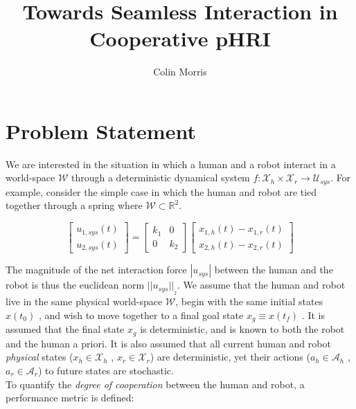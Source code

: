 \documentclass[conference]{IEEEtran}
\begin{document}
\title{Towards Seamless Interaction in \\ Cooperative pHRI} 
\author{Colin Morris}
\maketitle

\section{Problem Statement} 
\hspace{5mm}
We are interested in the situation in which a human and a robot interact in a world-space $\mathcal{W}$ through a deterministic dynamical system $f : \mathcal{X}_h \times \mathcal{X}_r \rightarrow \mathcal{U}_{sys}$. For example, consider the simple case in which the human and robot are tied together through a spring where $\mathcal{W}\subset\mathbb{R}^2$. 

\begin{equation*}
\begin{bmatrix} u_{1,sys}(t)\\u_{2,sys}(t) \end{bmatrix} = 
\begin{bmatrix} k_1&0\\0&k_2 \end{bmatrix}
\begin{bmatrix} x_{1,h}(t) - x_{1,r}(t) \\x_{2,h}(t) - x_{2,r}(t) \end{bmatrix}
\end{equation*}

The magnitude of the net interaction force $|u_{sys}|$ between the human and the robot is thus the euclidean norm $||u_{sys}||_{_2}$. 
We assume that the human and robot live in the same physical world-space $\mathcal{W}$, begin with the same initial states $x(t_0)$ , and wish to move together to a final goal state $x_g \equiv x(t_f) $ . It is assumed that the final state $x_g$ is deterministic, and is known to both the robot and the human a priori. It is also assumed that all current human and robot \textit{physical} states ($x_h \in \mathcal{X}_h$ , $x_r \in \mathcal{X}_r$) are deterministic, yet their actions ($a_h \in \mathcal{A}_h$ , $a_r \in \mathcal{A}_r$) to future states are stochastic. \\

To quantify the \textit{degree of cooperation} between the human and robot, a performance metric is defined:
 
\end{document}

